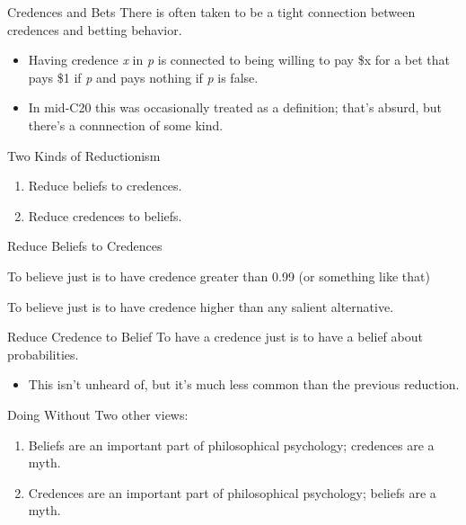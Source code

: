 \documentclass[
  17pt,
  letterpaper,
  ignorenonframetext,
  aspectratio=169,
]{beamer}
\providecommand{\tightlist}{%
  \setlength{\itemsep}{0pt}\setlength{\parskip}{0pt}}\usepackage{longtable,booktabs,array}
\begin{document}
\begin{frame}{Credences and Bets}
\protect\hypertarget{credences-and-bets}{}
There is often taken to be a tight connection between credences and
betting behavior.

\begin{itemize}[<+->]
\tightlist
\item
  Having credence \emph{x} in \emph{p} is connected to being willing to
  pay \$x for a bet that pays \$1 if \emph{p} and pays nothing if
  \emph{p} is false.
\item
  In mid-C20 this was occasionally treated as a definition; that's
  absurd, but there's a connnection of some kind.
\end{itemize}
\end{frame}

\begin{frame}{Two Kinds of Reductionism}
\protect\hypertarget{two-kinds-of-reductionism}{}
\begin{enumerate}[<+->]
\tightlist
\item
  Reduce beliefs to credences.
\item
  Reduce credences to beliefs.
\end{enumerate}
\end{frame}

\begin{frame}{Reduce Beliefs to Credences}
\protect\hypertarget{reduce-beliefs-to-credences}{}
\begin{description}[<+->]
\tightlist
\item[Simple reduction]
To believe just is to have credence greater than 0.99 (or something like
that)
\item[Complicated reduction]
To believe just is to have credence higher than any salient alternative.
\end{description}
\end{frame}

\begin{frame}{Reduce Credence to Belief}
\protect\hypertarget{reduce-credence-to-belief}{}
To have a credence just is to have a belief about probabilities.

\begin{itemize}[<+->]
\tightlist
\item
  This isn't unheard of, but it's much less common than the previous
  reduction.
\end{itemize}
\end{frame}

\begin{frame}{Doing Without}
\protect\hypertarget{doing-without}{}
Two other views:

\begin{enumerate}[<+->]
\tightlist
\item
  Beliefs are an important part of philosophical psychology; credences
  are a myth.
\item
  Credences are an important part of philosophical psychology; beliefs
  are a myth.
\end{enumerate}
\end{frame}
\end{document}
